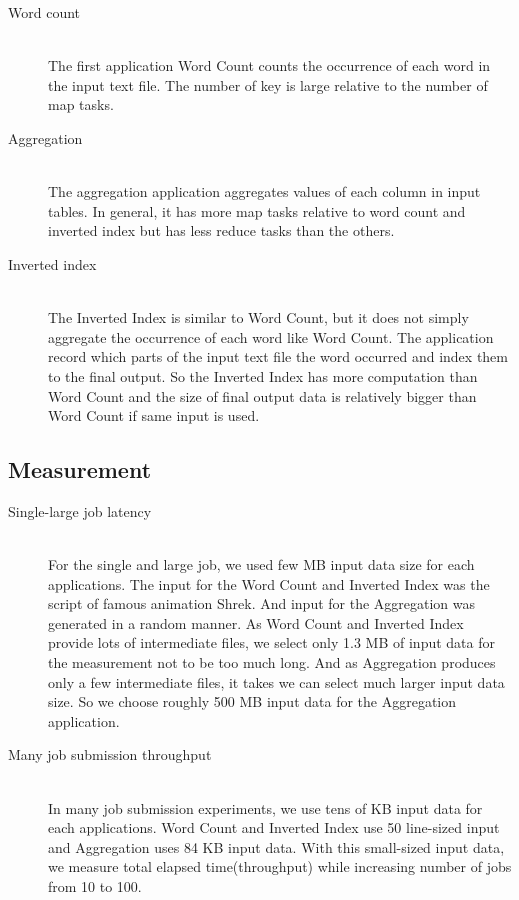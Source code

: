 \begin{description}
\item[Word count] \hfill \\
The first application Word Count counts the occurrence of each word in the input text file. 
The number of key is large relative to the number of map tasks.

\item[Aggregation] \hfill \\
The aggregation application aggregates values of each column in input tables. In general, 
it has more map tasks relative to word count and inverted index but has less reduce tasks than the others.

\item[Inverted index] \hfill \\
The Inverted Index is similar to Word Count, but it does not simply aggregate the occurrence 
of each word like Word Count. The application record which parts of the input text file the word occurred and 
index them to the final output. So the Inverted Index has more computation than Word Count and the size of 
final output data is relatively bigger than Word Count if same input is used.
\end{description}

\subsection*{Measurement}

\begin{description}

\item[Single-large job latency] \hfill \\
For the single and large job, we used few MB input data size for each applications. 
The input for the Word Count and Inverted Index was the script of famous animation Shrek. 
And input for the Aggregation was generated in a random manner. As Word Count and Inverted 
Index provide lots of intermediate files, we select only 1.3 MB of input data for the measurement 
not to be too much long. And as Aggregation produces only a few intermediate files, it takes we can 
select much larger input data size. So we choose roughly 500 MB input data for the Aggregation application.

\item[Many job submission throughput] \hfill \\
In many job submission experiments, we use tens of KB input data for each applications. 
Word Count and Inverted Index use 50 line-sized input and Aggregation uses 84 KB input 
data. With this small-sized input data, we measure total elapsed time(throughput) while 
increasing number of jobs from 10 to 100.

\end{description}

